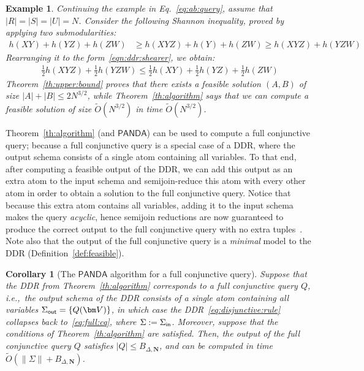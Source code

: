 \documentclass[10pt,a4paper]{article}
\newtheorem{corollary}{Corollary}[section]
\newtheorem{example}{Example}[section]
\newcommand{\norm}[1]{\|#1\|}
\newcommand{\set}[1]{\{#1\}}                    %
\newcommand{\inn}{\text{\sf in}}
\newcommand{\out}{\text{\sf out}}
\newcommand{\panda}{\textsf{PANDA}\xspace}
\begin{document}
\begin{example} \label{ex:ab:query:continued} Continuing the example in
  Eq.~\eqref{eq:ab:query}, assume that $|R|=|S|=|U|=N$.  Consider the
  following Shannon inequality, proved by applying two submodularities:
%
  \begin{align*}
    h(XY)+h(YZ)+h(ZW) & \geq h(XYZ) + h(Y) + h(ZW) \geq h(XYZ)+h(YZW)
  \end{align*}
%
  Rearranging it to the form~\eqref{eqn:ddr:shearer}, we obtain:
  \begin{align}
    \frac{1}{2}h(XYZ) + \frac{1}{2}h(YZW) \leq \frac{1}{2}h(XY)+\frac{1}{2}h(YZ)+\frac{1}{2}h(ZW)
    \label{eq:panda:example:shannon}
  \end{align}
  Theorem~\ref{th:upper:bound} proves that there exists a feasible
  solution $(A,B)$ of size $|A|+|B| \leq 2N^{3/2}$, while
  Theorem~\ref{th:algorithm} says that we can compute a feasible
  solution of size $\tilde O(N^{3/2})$ in time $\tilde O(N^{3/2})$.
\end{example}

Theorem~\ref{th:algorithm} (and $\panda$) can be used to compute a full conjunctive query;
because a full conjunctive query is a special case of a DDR, where the output schema
consists of a single atom containing all variables. To that end, after computing a feasible output of the
DDR, we can add this output as an extra atom to the input schema and semijoin-reduce this atom with every other atom in order to obtain a solution to the
full conjunctive query.
Notice that because this extra atom contains all variables, adding it to the input schema
makes the query {\em acyclic}, hence semijoin reductions are now guaranteed to produce the correct output to the full conjunctive query with no extra tuples~\cite{DBLP:conf/vldb/Yannakakis81}.
Note also that the output of the full conjunctive query is a {\em minimal} model to the DDR
(Definition~\ref{def:feasible}).

\begin{corollary}[The $\panda$ algorithm for a full conjunctive query]
    \label{cor:full:cq}
  Suppose that the DDR from Theorem~\ref{th:algorithm}
  corresponds to a full conjunctive query $Q$, i.e.,~the output schema of the DDR consists of a single atom containing all variables $\Sigma_{\out}=\set{Q(\bm V)}$, in which case
  the DDR~\eqref{eq:disjunctive:rule} collapses back to~\eqref{eq:full:cq}, where $\Sigma := \Sigma_{\inn}$.
  Moreover, suppose that the conditions of Theorem~\ref{th:algorithm} are satisfied.
  Then, the output of the full conjunctive query $Q$ satisfies $|Q| \leq B_{\Delta,\bm N}$, and can be
  computed in time $\tilde O(\norm{\Sigma} + B_{\Delta,\bm N})$.
\end{corollary}
\end{document}
